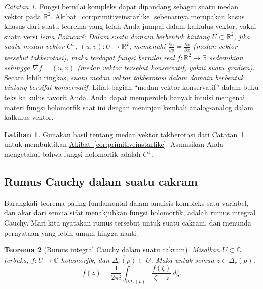 \documentclass[12pt,openany]{book}
\newcommand{\C}{{\mathbb{C}}}
\newcommand{\R}{{\mathbb{R}}}
\newcommand{\myindex}[1]{#1\index{#1}}
\newcommand{\myquote}[1]{``#1''}
\theoremstyle{plain}
\newtheorem{thm}{Teorema}[section]
\theoremstyle{remark}
\newtheorem{remark}[thm]{Catatan}
\theoremstyle{definition}
\newenvironment{exbox}{%
    \def\FrameCommand{\vrule width 1pt \relax\hspace{10pt}}%
    \MakeFramed{\advance\hsize-\width\FrameRestore}%
}{%
    \endMakeFramed
}
\theoremstyle{exercise}
\newtheorem{exercise}{Latihan}[section]
\theoremstyle{example}
\newcommand{\corref}[1]{\hyperref[#1]{Akibat~\ref*{#1}}}
\newcommand{\remarkref}[1]{\hyperref[#1]{Catatan~\ref*{#1}}}
\begin{document}
\begin{remark}\label{remark:irrotvfield}
Fungsi bernilai kompleks dapat dipandang sebagai suatu medan vektor pada $\R^2$.
\corref{cor:primitiveinstarlike}
sebenarnya merupakan kasus khusus dari suatu teorema yang telah Anda jumpai
dalam kalkulus vektor, yakni suatu versi \emph{\myindex{lema Poincar\'e}}:
\emph{Dalam suatu domain berbentuk bintang $U \subset \R^2$, jika suatu
medan vektor $C^1$, $(u,v) \colon U \to \R^2$,
memenuhi $\frac{\partial u}{\partial y} = \frac{\partial v}{\partial x}$
(medan vektor tersebut \emph{takberotasi}),
maka terdapat fungsi bernilai real $f \colon \R^2 \to \R$ sedemikian sehingga
$\nabla f = (u,v)$ (medan vektor tersebut konservatif, yakni suatu gradien).}
Secara lebih ringkas, \emph{suatu medan vektor takberotasi
dalam domain berbentuk bintang bersifat konservatif.}
Lihat bagian \myquote{medan vektor konservatif}
dalam buku teks kalkulus favorit Anda.  Anda dapat memperoleh banyak
intuisi mengenai materi fungsi holomorfik saat ini dengan meninjau kembali
analog-analog dalam kalkulus vektor.
\end{remark}

\begin{exbox}
\begin{exercise}
Gunakan hasil tentang medan vektor takberotasi dari
\remarkref{remark:irrotvfield} untuk membuktikan 
\corref{cor:primitiveinstarlike}.
Asumsikan Anda mengetahui bahwa fungsi holomorfik adalah $C^1$.
\end{exercise}
\end{exbox}

\subsection{Rumus Cauchy dalam suatu cakram}

Barangkali teorema paling fundamental dalam analisis kompleks satu variabel,
dan akar dari semua sifat menakjubkan fungsi holomorfik,
adalah rumus integral Cauchy.  Mari kita nyatakan rumus tersebut untuk suatu cakram, dan menunda
pernyataan yang lebih umum hingga nanti.

\begin{thm}[Rumus integral Cauchy dalam suatu cakram]
Misalkan $U \subset \C$ terbuka, $f \colon U \to \C$ holomorfik,
dan $\overline{\Delta_r(p)} \subset U$.
Maka untuk semua $z \in \Delta_r(p)$,
\begin{equation*}
f(z)
=
\frac{1}{2\pi i}
\int_{\partial \Delta_r(p)}
\frac{f(\zeta)}{\zeta-z}
\,
d \zeta .
\end{equation*}
\end{thm}
\end{document}
